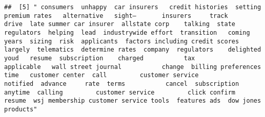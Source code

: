 \documentclass[
]{article}
\begin{document}
\begin{verbatim}
##  [5] " consumers  unhappy  car insurers   credit histories  setting premium rates   alternative   sight—       insurers     track      drive  late summer car insurer  allstate corp    talking  state regulators  helping  lead  industrywide effort  transition   coming years  sizing  risk  applicants  factors including credit scores  largely  telematics  determine rates  company  regulators    delighted  youd   resume  subscription    charged           tax          applicable   wall street journal           change  billing preferences   time   customer center  call         customer service            notified  advance     rate  terms           cancel  subscription  anytime  calling         customer service         click confirm  resume  wsj membership customer service tools  features ads  dow jones products"                                                                                                                                                                                                                                                                                                                                                                                                                                                                                                                                                                                                                                                                                                                                                                                                                                                                                                                                                                                                                                                                                                                                                                                                                                                                                                                                                                                                                                                                                                                                                                                                                                                                                                                                                                                                                                                                                                                                                                                                                                                                                                                                                                                                                                                                                                                                                                                                                                                                                                                                                                                                    
\end{verbatim}
\end{document}
